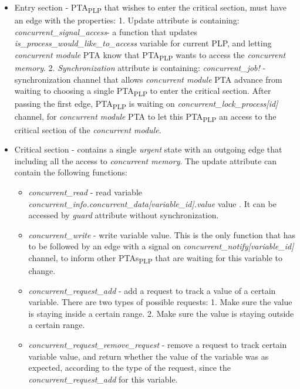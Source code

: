 \begin{itemize}
\item Entry section - PTA\textsubscript{PLP} that wishes to enter the critical section, must have an edge with the properties: 1. Update attribute is containing: \textcolor{ColorUppaalFunction}{\textit{concurrent_signal_access}}​ - a function that updates \textcolor{ColorEdgeGuard}{\textit{is_process_would_like_to_access}} variable for current PLP, and letting \textit{concurrent module} PTA know that PTA\textsubscript{PLP} wants to access the \textit{concurrent memory}. 2. \textit{Synchronization} attribute is containing: \textcolor{ColorUppaalChannel}{\textit{concurrent_job!}} - synchronization channel that allows \textit{concurrent module} PTA advance from waiting to choosing a single PTA\textsubscript{PLP} to enter the critical section. After passing the first edge, PTA\textsubscript{PLP} is waiting on \textcolor{ColorUppaalChannel}{\textit{concurrent_lock_process[id]}} channel, for \textit{concurrent module} PTA to let this PTA\textsubscript{PLP} an access to the critical section of the \textit{concurrent module}. 
\item Critical section - contains a single \textit{urgent} state with an outgoing edge that including all the access to \textit{concurrent memory}. The update attribute can contain the following functions:\begin{itemize}
\item \textcolor{ColorUppaalFunction}{\textit{concurrent_read}} - read variable \textcolor{ColorEdgeGuard}{\textit{concurrent_info.concurrent_data[\textcolor{ColorEdgeGuard}{\textit{variable_id}}].value}} value . It can be accessed by \textit{guard} attribute without synchronization.
\item \textcolor{ColorUppaalFunction}{\textit{concurrent_write}} - write variable value. This is the only function that has to be followed by an edge with a signal on \textcolor{ColorUppaalChannel}{\textit{concurrent_notify[\textcolor{ColorEdgeGuard}{\textit{variable_id}}]}} channel, to inform other PTAs\textsubscript{PLP} that are waiting for this variable to change. 
\item \textcolor{ColorUppaalFunction}{\textit{concurrent_request_add}} - add a request to track a value of a certain variable. There are two types of possible requests: 1. Make sure the value is staying inside a certain range. 2. Make sure the value is staying outside a certain range.
\item \textcolor{ColorUppaalFunction}{\textit{concurrent_request_remove_request}} - remove a request to track certain variable value, and return whether the value of the variable was as expected, according to the type of the request, since the \textcolor{ColorUppaalFunction}{\textit{concurrent_request_add}} for this variable. \end{itemize}

\end{itemize}
